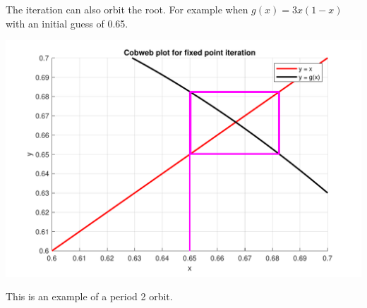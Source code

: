 \documentclass[a4paper,11pt]{article}
\begin{document}
\begin{enumerate}
	The iteration can also orbit the root. For example when $g(x)=3x(1-x)$ 
	with an initial guess of 0.65.
	
	\begin{center}
		\includegraphics[scale=0.6]{images/Q1d_orbit.pdf}
	\end{center}
	This is an example of a period 2 orbit.
	
\end{enumerate}
\end{document}
